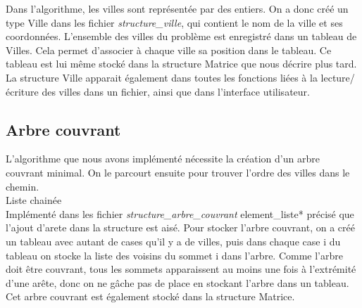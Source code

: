 \documentclass[a4paper,11pt]{article}
\begin{document}
Dans l'algorithme, les villes sont représentée par des entiers. On a donc créé un type \textsf{Ville} dans les fichier \emph{structure\_ville}, qui contient le nom de la ville et ses coordonnées. L'ensemble des villes du problème est enregistré dans un tableau de Villes. Cela permet d'associer à chaque ville sa position dans le tableau. Ce tableau est lui même stocké dans la structure \textsf{Matrice} que nous décrire plus tard.\\
La structure Ville apparait également dans toutes les fonctions liées à la lecture/écriture des villes dans un fichier, ainsi que dans l'interface utilisateur.\\

\subsection{Arbre couvrant}

L'algorithme que nous avons implémenté nécessite la création d'un arbre couvrant minimal. On le parcourt ensuite pour trouver l'ordre des villes dans le chemin.\\
{\Large Liste chainée}\\
Implémenté dans les fichier \emph{structure\_arbre\_couvrant}
\textsf{element\_liste*}
précisé que l'ajout d'arete dans la structure est aisé.
Pour stocker l'arbre couvrant, on a créé un tableau avec autant de cases qu'il y a de villes, puis dans chaque case i du tableau on stocke la liste des voisins du sommet i dans l'arbre. Comme l'arbre doit être couvrant, tous les sommets apparaissent au moins une fois à l'extrémité d'une arête, donc on ne gâche pas de place en stockant l'arbre dans un tableau.\\
Cet arbre couvrant est également stocké dans la structure Matrice.\\
\end{document}
